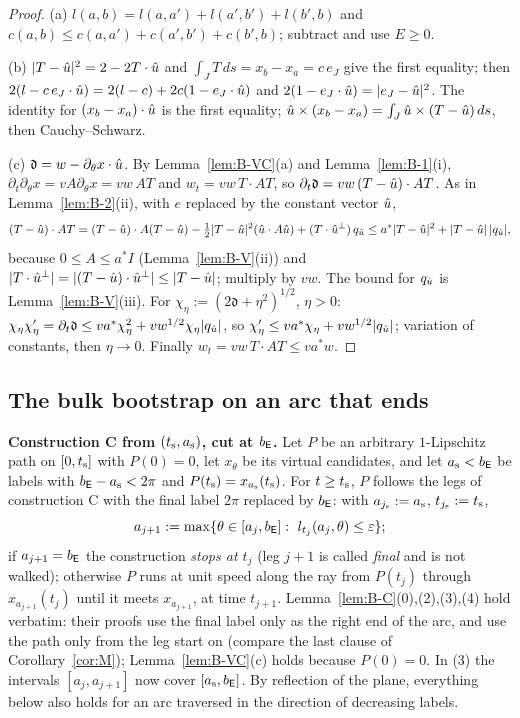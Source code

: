 \begin{proof}
(a) $l(a,b)=l(a,a')+l(a',b')+l(b',b)$ and $c(a,b)\le c(a,a')+c(a',b')+c(b',b)$; subtract and use $E\ge0$.

(b) $|T-\hat u|^2=2-2T\cdot\hat u$ and $\int_JT\,ds=x_b-x_a=c\,e_J$ give the first equality; then
$2(l-c\,e_J\cdot\hat u)=2(l-c)+2c(1-e_J\cdot\hat u)$ and $2(1-e_J\cdot\hat u)=|e_J-\hat u|^2$. The identity for $(x_b-x_a)\cdot\hat u$ is the first
equality; $\hat u\times(x_b-x_a)=\int_J\hat u\times(T-\hat u)\,ds$, then Cauchy--Schwarz.

(c) $\mathfrak d=w-\partial_\theta x\cdot\hat u$. By Lemma~\ref{lem:B-VC}(a) and Lemma~\ref{lem:B-1}(i),
$\partial_t\partial_\theta x=vA\partial_\theta x=vw\,AT$ and $w_t=vw\,T\cdot AT$, so $\partial_t\mathfrak d=vw\,(T-\hat u)\cdot AT$.
As in Lemma~\ref{lem:B-2}(ii), with $e$ replaced by the constant vector $\hat u$,
\[
(T-\hat u)\cdot AT=(T-\hat u)\cdot A(T-\hat u)-\tfrac12|T-\hat u|^2(\hat u\cdot A\hat u)+(T\cdot\hat u^\perp)\,q_{\hat u}
\le a^*|T-\hat u|^2+|T-\hat u|\,|q_{\hat u}|,
\]
because $0\le A\le a^*I$ (Lemma~\ref{lem:B-V}(ii)) and $|T\cdot\hat u^\perp|=|(T-\hat u)\cdot\hat u^\perp|\le|T-\hat u|$; multiply by $vw$. The
bound for $q_{\hat u}$ is Lemma~\ref{lem:B-V}(iii). For $\chi_\eta:=(2\mathfrak d+\eta^2)^{1/2}$, $\eta>0$:
$\chi_\eta\chi_\eta'=\partial_t\mathfrak d\le va^*\chi_\eta^2+vw^{1/2}\chi_\eta|q_{\hat u}|$, so
$\chi_\eta'\le va^*\chi_\eta+vw^{1/2}|q_{\hat u}|$; variation of constants, then $\eta\to0$. Finally $w_t=vw\,T\cdot AT\le va^*w$.
\end{proof}

\subsection{The bulk bootstrap on an arc that ends}

\noindent\textbf{Construction C from $(t_{\mathrm s},a_{\mathrm s})$, cut at $b_{\mathsf E}$.} Let $P$ be an arbitrary $1$-Lipschitz path on
$[0,t_{\mathrm s}]$ with $P(0)=0$, let $x_\theta$ be its virtual candidates, and let $a_{\mathrm s}<b_{\mathsf E}$ be labels with
$b_{\mathsf E}-a_{\mathrm s}<2\pi$ and $P(t_{\mathrm s})=x_{a_{\mathrm s}}(t_{\mathrm s})$. For $t\ge t_{\mathrm s}$, $P$ follows the legs of construction C with the
final label $2\pi$ replaced by $b_{\mathsf E}$: with $a_{j_{\mathrm s}}:=a_{\mathrm s}$, $t_{j_{\mathrm s}}:=t_{\mathrm s}$,
\[
a_{j+1}:=\max\{\theta\in[a_j,\EbE]:\ l_{t_j}(a_j,\theta)\le\varepsilon\};
\]
if $a_{j+1}=b_{\mathsf E}$ the construction \emph{stops at $t_j$} (leg $j+1$ is called \emph{final} and is not walked); otherwise $P$ runs at
unit speed along the ray from $P(t_j)$ through $x_{a_{j+1}}(t_j)$ until it meets $x_{a_{j+1}}$, at time $t_{j+1}$.
Lemma~\ref{lem:B-C}(0),(2),(3),(4) hold verbatim: their proofs use the final label only as the right end of the arc, and use the
path only from the leg start on (compare the last clause of Corollary~\ref{cor:M}); Lemma~\ref{lem:B-VC}(c) holds because $P(0)=0$.
In (3) the intervals $[a_j,a_{j+1}]$ now cover $[a_{\mathrm s},b_{\mathsf E}]$. By reflection of the plane, everything below also holds for
an arc traversed in the direction of decreasing labels.

